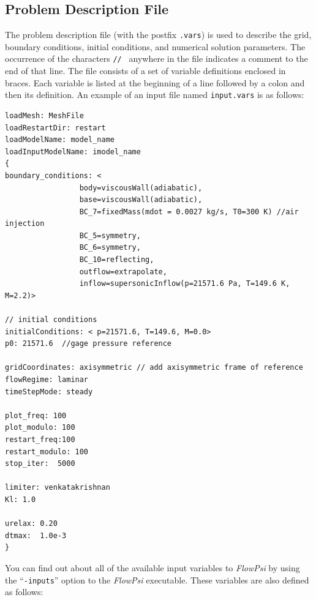 \documentclass{article}
\begin{document}
\subsection{Problem Description File}
\label{prob_description_file}

The problem description file (with the postfix {\tt .vars}) is used to
describe the grid, boundary conditions, initial conditions, and
numerical solution parameters.  The occurrence of the characters {\tt // }
anywhere in the file indicates a comment to the end of that line.  The
file consists of a set of variable definitions enclosed in braces.
Each variable is listed at the beginning of a line followed by a colon
and then its definition.  An example of an input file
named {\tt input.vars} is as follows:
\begin{verbatim}
loadMesh: MeshFile
loadRestartDir: restart
loadModelName: model_name
loadInputModelName: imodel_name
{
boundary_conditions: <
                 body=viscousWall(adiabatic),
                 base=viscousWall(adiabatic),
                 BC_7=fixedMass(mdot = 0.0027 kg/s, T0=300 K) //air injection
                 BC_5=symmetry,
                 BC_6=symmetry,
                 BC_10=reflecting,
                 outflow=extrapolate,
                 inflow=supersonicInflow(p=21571.6 Pa, T=149.6 K, M=2.2)>

// initial conditions
initialConditions: < p=21571.6, T=149.6, M=0.0>
p0: 21571.6  //gage pressure reference

gridCoordinates: axisymmetric // add axisymmetric frame of reference
flowRegime: laminar
timeStepMode: steady 

plot_freq: 100
plot_modulo: 100
restart_freq:100
restart_modulo: 100
stop_iter:  5000

limiter: venkatakrishnan
Kl: 1.0

urelax: 0.20
dtmax:  1.0e-3
}
\end{verbatim} 

You can find out about all of the available input variables to {\em FlowPsi}
by using the ``{\tt -inputs}'' option to the {\em FlowPsi} executable.
These variables are also defined as follows:
\end{document}
